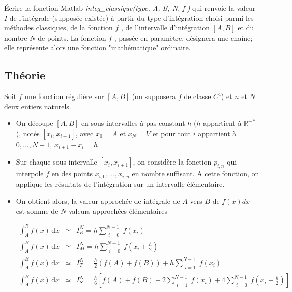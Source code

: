 \documentclass[a4paper,10pt]{report}
\newcommand{\R}{\mathbb{R}}
\begin{document}
Écrire la fonction Matlab \textit{integ\_classique(type, A, B, N, f )} qui renvoie la valeur $I$ de l’intégrale (supposée existée) à partir du type d’intégration choisi parmi les méthodes classiques, de la fonction $f$ , de l’intervalle d’intégration $[A, B]$ et du nombre $N$ de points. La fonction $f$ , passée en paramètre, désignera une chaîne; elle représente alors une fonction "mathématique" ordinaire.

\subsection*{Théorie}

Soit $f$ une fonction régulière sur $[A, B]$ (on supposera $f$ de classe $C^{4}$) et $n$ et $N$ deux entiers naturels.

\begin{itemize}
\item On découpe $[A, B]$ en sous-intervalles à pas constant $h$ ($h$ appartient à $\R^{+*}$), notés $[x_i, x_{i+1}]$, avec $x_0 = A$ et $x_N = V$ et pour tout $i$ appartient à ${0,...,N-1}$, $x_{i+1}-x_i = h$
\item Sur chaque sous-intervalle $[x_i, x_{i+1}]$, on considère la fonction $p_{i,n}$ qui interpole $f$ en des points ${x_{i,0} ,..., x_{i,n}}$ en nombre suffisant. A cette fonction, on applique les résultats de l’intégration sur un intervalle élémentaire.

\item On obtient alors, la valeur approchée de intégrale de $A$ vers $B$ de $f(x) dx$  est somme de $N$ valeurs approchées élémentaires

\begin{eqnarray}
\int_{A}^{B} f(x) \, \mathrm{d}x &\simeq& I^{N}_{R} = h \sum_{\substack{i=0}}^{N-1} f \left(x_i\right)\\
\int_{A}^{B} f(x) \, \mathrm{d}x &\simeq& I^{N}_{M} = h \sum_{\substack{i=0}}^{N-1} f \left(x_i + \frac{h}{2}\right)\\
\int_{A}^{B} f(x) \, \mathrm{d}x &\simeq& I^{N}_{T} = \frac{h}{2}(f(A)+f(B))+h \sum_{\substack{i=1}}^{N-1} f \left(x_i\right)\\
\int_{A}^{B} f(x) \, \mathrm{d}x &\simeq& I^{N}_{S} = \frac{h}{6}\left[f(A)+f(B)+2\sum_{\substack{i=1}}^{N-1}f(x_i) + 4\sum_{\substack{i=0}}^{N-1}f\left(x_i + \frac{h}{2}\right)\right]
\end{eqnarray}

\end{itemize}
\newpage
\end{document}

